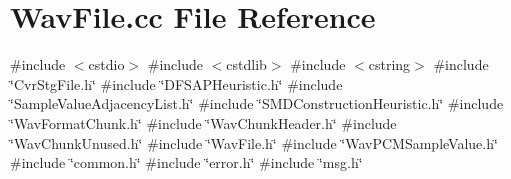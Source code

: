 \section{Wav\+File.\+cc File Reference}
\label{WavFile_8cc}
{\ttfamily \#include $<$cstdio$>$}\newline
{\ttfamily \#include $<$cstdlib$>$}\newline
{\ttfamily \#include $<$cstring$>$}\newline
{\ttfamily \#include \char`\"{}Cvr\+Stg\+File.\+h\char`\"{}}\newline
{\ttfamily \#include \char`\"{}D\+F\+S\+A\+P\+Heuristic.\+h\char`\"{}}\newline
{\ttfamily \#include \char`\"{}Sample\+Value\+Adjacency\+List.\+h\char`\"{}}\newline
{\ttfamily \#include \char`\"{}S\+M\+D\+Construction\+Heuristic.\+h\char`\"{}}\newline
{\ttfamily \#include \char`\"{}Wav\+Format\+Chunk.\+h\char`\"{}}\newline
{\ttfamily \#include \char`\"{}Wav\+Chunk\+Header.\+h\char`\"{}}\newline
{\ttfamily \#include \char`\"{}Wav\+Chunk\+Unused.\+h\char`\"{}}\newline
{\ttfamily \#include \char`\"{}Wav\+File.\+h\char`\"{}}\newline
{\ttfamily \#include \char`\"{}Wav\+P\+C\+M\+Sample\+Value.\+h\char`\"{}}\newline
{\ttfamily \#include \char`\"{}common.\+h\char`\"{}}\newline
{\ttfamily \#include \char`\"{}error.\+h\char`\"{}}\newline
{\ttfamily \#include \char`\"{}msg.\+h\char`\"{}}\newline
